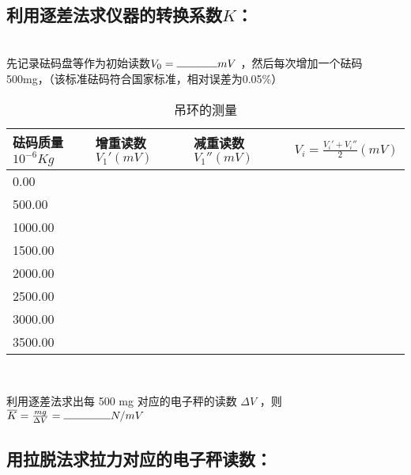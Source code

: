 \documentclass{ctexart}
\begin{document}
~

\subsection{利用逐差法求仪器的转换系数$K$：}
~\\
先记录砝码盘等作为初始读数$V_0 = \rule{1.3cm}{0.4pt} mV $ ，然后每次增加一个砝码500mg，（该标准砝码符合国家标准，相对误差为0.05\%）
~\\

\begin{table}[h]
    \renewcommand\arraystretch{1.3}
    \centering
    \caption{吊环的测量}
    \label{tab:k}
    \begin{tabular}{|m{2cm}<{\centering}|m{2cm}<{\centering}|m{2cm}<{\centering}|m{3.5cm}<{\centering}|}
        \hline
        砝码质量 $10^{-6} Kg $ & 增重读数 $V_1' (mV)$ & 减重读数 $V_1'' (mV)$ & $V_i = \frac{V_i{'}+V_i{''}}{2} (mV)$ \\
        \hline
        0.00 & & & \\
        \hline
        500.00 & & & \\
        \hline
        1000.00 & & & \\
        \hline
        1500.00 & & & \\
        \hline
        2000.00 & & & \\
        \hline
        2500.00 & & & \\
        \hline
        3000.00 & & & \\
        \hline
        3500.00 & & & \\
        \hline
    \end{tabular}
\end{table}

~

利用逐差法求出每 500 mg 对应的电子秤的读数 $\Delta V$ ，则 $\overline{K} = \frac{mg}{\Delta V} = \rule{1.5cm}{0.4pt} N/mV $ 
\newpage
\subsection{用拉脱法求拉力对应的电子秤读数：}
\end{document}
